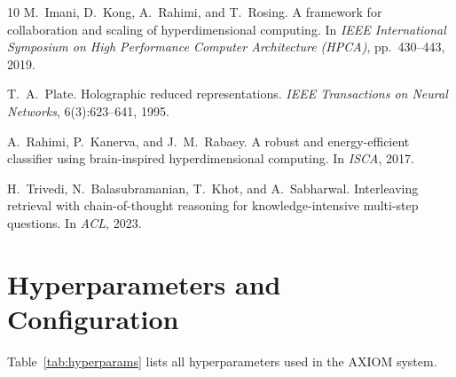 \documentclass[11pt,a4paper]{article}
\begin{document}
\begin{thebibliography}{10}
M.~Imani, D.~Kong, A.~Rahimi, and T.~Rosing.
\newblock A framework for collaboration and scaling of hyperdimensional
  computing.
\newblock In \emph{IEEE International Symposium on High Performance Computer
  Architecture (HPCA)}, pp.~430--443, 2019.

T.~A.~Plate.
\newblock Holographic reduced representations.
\newblock \emph{IEEE Transactions on Neural Networks}, 6(3):623--641, 1995.

A.~Rahimi, P.~Kanerva, and J.~M.~Rabaey.
\newblock A robust and energy-efficient classifier using brain-inspired
  hyperdimensional computing.
\newblock In \emph{ISCA}, 2017.

H.~Trivedi, N.~Balasubramanian, T.~Khot, and A.~Sabharwal.
\newblock Interleaving retrieval with chain-of-thought reasoning for
  knowledge-intensive multi-step questions.
\newblock In \emph{ACL}, 2023.

\end{thebibliography}

\appendix
\section{Hyperparameters and Configuration}
\label{app:hyperparams}

Table~\ref{tab:hyperparams} lists all hyperparameters used in the
AXIOM system.
\end{document}
